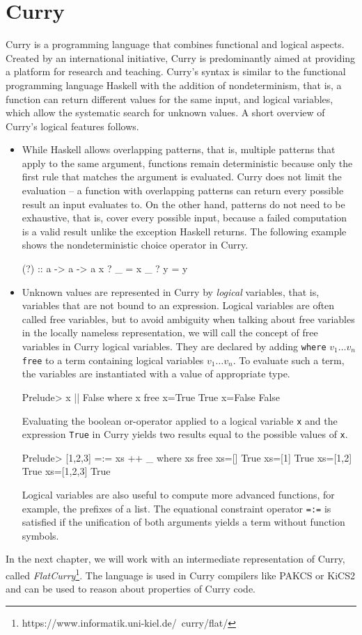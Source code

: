 \documentclass[a4paper, 11pt, fleqn]{scrreprt}
\newcommand{\coqinline}[1]{\texttt{#1}}
\begin{document}
	\section{Curry}
	Curry \citep{report} is a programming language that combines functional and logical aspects. Created by an international initiative, Curry is predominantly aimed at providing a platform for research and teaching. Curry's syntax is similar to the functional programming language Haskell with the addition of nondeterminism, that is, a function can return different values for the same input, and logical variables, which allow the systematic search for unknown values. A short overview of Curry's logical features follows.
	\begin{itemize}
		\item While Haskell allows overlapping patterns, that is, multiple patterns that apply to the same argument, functions remain deterministic because only the first rule that matches the argument is evaluated. Curry does not limit the evaluation -- a function with overlapping patterns can return every possible result an input evaluates to. On the other hand, patterns do not need to be exhaustive, that is, cover every possible input, because a failed computation is a valid result unlike the exception Haskell returns. The following example shows the nondeterministic choice operator in Curry.
		\begin{haskellcode}
(?) :: a -> a -> a
x ? _ = x
_ ? y = y
		\end{haskellcode}
	
		\item Unknown values are represented in Curry by \textit{logical} variables, that is, variables that are not bound to an expression. Logical variables are often called free variables, but to avoid ambiguity when talking about free variables in the locally nameless representation, we will call the concept of free variables in Curry logical variables. They are declared by adding \texttt{where} $v_1\dots v_n$ \texttt{free} to a term containing logical variables $v_1 \dots v_n$. To evaluate such a term, the variables are instantiated with a value of appropriate type. 
		\begin{haskellcode}
Prelude> x || False where x free
{x=True} True
{x=False} False
		\end{haskellcode}
		Evaluating the boolean or-operator applied to a logical variable \coqinline{x} and the expression \coqinline{True} in Curry yields two results equal to the possible values of \coqinline{x}.
\begin{coqcode}
Prelude> [1,2,3] =:= xs ++ _ where xs free   
{xs=[]} True
{xs=[1]} True
{xs=[1,2]} True
{xs=[1,2,3]} True
\end{coqcode}
	Logical variables are also useful to compute more advanced functions, for example, the prefixes of a list. The equational constraint operator \coqinline{=:=} is satisfied if the unification of both arguments yields a term without function symbols.
	\end{itemize}
	In the next chapter, we will work with an intermediate representation of Curry, called \textit{FlatCurry}\footnote{https://www.informatik.uni-kiel.de/~curry/flat/}. The language is used in Curry compilers like PAKCS or KiCS2 and can be used to reason about properties of Curry code.
\end{document}
